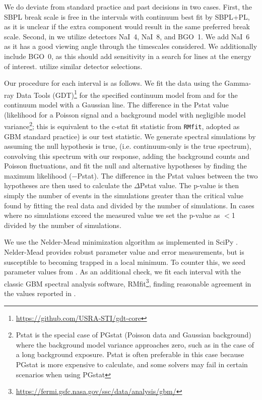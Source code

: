 \documentclass{aastex61}
\begin{document}
We do deviate from standard practice and past decisions in two cases. First, the SBPL break scale is free in the intervals with continuum best fit by SBPL+PL, as it is unclear if the extra component would result in the same preferred break scale. Second, in \citet{lesage2023fermi} we utilize detectors NaI~4, NaI~8, and BGO~1. We add NaI~6 as it has a good viewing angle through the timescales considered. We additionally include BGO~0, as this should add sensitivity in a search for lines at the energy of interest. \citet{ravasio2024mega} utilize similar detector selections.

Our procedure for each interval is as follows. We fit the data using the Gamma-ray Data Tools (GDT)\footnote{\url{https://github.com/USRA-STI/gdt-core}} for the specified continuum model from \citet{ravasio2024mega} and for the continuum model with a Gaussian line. The difference in the Pstat value (likelihood for a Poisson signal and a background model with negligible model variance\footnote{Pstat is the special case of PGstat (Poisson data and Gaussian background) where the background model variance approaches zero, such as in the case of a long background exposure. Pstat is often preferable in this case because PGstat is more expensive to calculate, and some solvers may fail in certain scenarios when using PGstat}; this is equivalent to the c-stat fit statistic from {\tt RMfit}, adopted as GBM standard practice) is our test statistic. We generate spectral simulations by assuming the null hypothesis is true, (i.e. continuum-only is the true spectrum), convolving this spectrum with our response, adding the background counts and Poisson fluctuations, and fit the null and alternative hypotheses by finding the maximum likelihood ($-$Pstat). The difference in the Pstat values between the two hypotheses are then used to calculate the $\Delta$Pstat value. The p-value is then simply the number of events in the simulations greater than the critical value found by fitting the real data and divided by the number of simulations. In cases where no simulations exceed the measured value we set the p-value as $<$1 divided by the number of simulations.

We use the Nelder-Mead minimization algorithm \citep{gao2012implementing} as implemented in SciPy \citep{virtanen2020scipy}. Nelder-Mead provides robust parameter value and error measurements, but is susceptible to becoming trapped in a local minimum. To counter this, we seed parameter values from \citet{ravasio2024mega}. As an additional check, we fit each interval with the classic GBM spectral analysis software, RMfit\footnote{\url{https://fermi.gsfc.nasa.gov/ssc/data/analysis/gbm/}}, finding reasonable agreement in the values reported in \citet{ravasio2024mega}.
\end{document}
